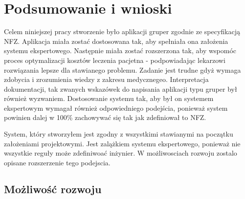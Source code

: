 \chapter{Podsumowanie i wnioski}
\label{cha:podsumowanie}

Celem niniejszej pracy stworzenie było aplikacji gruper zgodnie ze specyfikacją NFZ. Aplikacja miała zostać dostosowana tak, aby spełniała ona założenia systemu ekspertowego. Następnie miała zostać rozszerzona tak, aby wspomóc proces optymalizacji kosztów leczenia pacjetna - podpowiadając lekarzowi rozwiązania lepsze dla stawianego problemu. Zadanie jest trudne gdyż wymaga zdobycia i zrozumienia wiedzy z zakresu medycznegeo. Interpretacja dokumentacji, tak zwanych wskazówek do napisania aplikacji typu gruper był również wyzwaniem. Dostosowanie systemu tak, aby był on systemem ekspertowym wymagał również odpowiedniego podejścia, ponieważ system powinien dalej w 100\% zachowywać się tak jak zdefiniował to NFZ.

System, który stworzyłem jest zgodny z wszystkimi stawianymi na początku założeniami projektowymi. Jest zalążkiem systemu ekspertowego, ponieważ nie wszystkie reguły może zdefiniwoać inżynier. W możliwosciach rozwoju zostalo opisane rozszerzenie tego podejscia.


\section{Możliwość rozwoju}
\label{sec:mozliwoscRozwoju}

